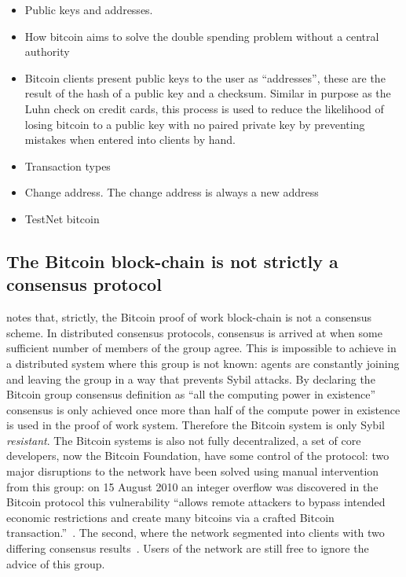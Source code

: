 \begin{itemize} \item Public keys and addresses.  \item How bitcoin aims to
        solve the double spending problem without a central authority \item
            Bitcoin clients present public keys to the user as ``addresses'',
            these are the result of the hash of a public key and a checksum.
            Similar in purpose as the Luhn check on credit cards, this process
        is used to reduce the likelihood of losing bitcoin to a public key with
    no paired private key by preventing mistakes when entered into clients by
hand.  \item Transaction types \item Change address.  The change address is
always a new address \item TestNet bitcoin \end{itemize}


\subsection{The Bitcoin block-chain is not strictly a consensus protocol}
\textcite{bitcoin-impossible} notes that, strictly, the Bitcoin proof of work block-chain is not a consensus scheme. In distributed consensus protocols, consensus is arrived at when some sufficient number of members of the group agree. This is impossible to achieve in a distributed system where this group is not known: agents are constantly joining and leaving the group in a way that prevents Sybil attacks. By declaring the Bitcoin group consensus definition as ``all the computing power in existence'' consensus is only achieved once more than half of the compute power in existence is used in the proof of work system. Therefore the Bitcoin system is only Sybil \emph{resistant}. The Bitcoin systems is also not fully decentralized, a set of core developers, now the Bitcoin Foundation, have some control of the protocol: two major disruptions to the network have been solved using manual intervention from this group: on 15 August 2010 an integer overflow was discovered in the Bitcoin protocol this vulnerability ``allows remote attackers to bypass intended economic restrictions and create many bitcoins via a crafted Bitcoin transaction.''~\cite{CVE-2010-5139}. The second, where the network segmented into clients with two differing consensus results~\cite{CVE-2013-3220,glitch-report,major-glitch}. Users of the network are still free to ignore the advice of this group.

